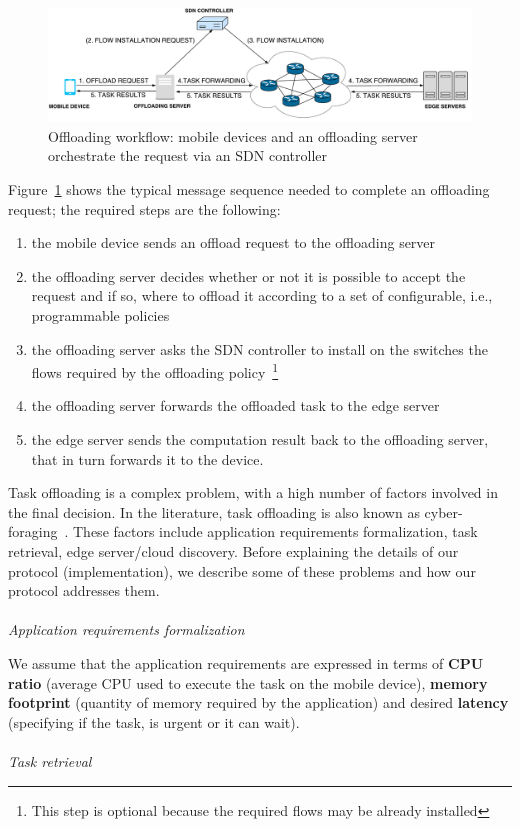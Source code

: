 \begin{figure}
\centering
\includegraphics[width=\textwidth]{img/protocol_sequence}   
\caption{Offloading workflow: mobile devices and an offloading server orchestrate the request via an SDN controller}
\label{fig:protocol}
\end{figure}

Figure~\ref{fig:protocol} shows the typical message sequence needed to complete an offloading request; the required steps are the following:
\begin{enumerate}
\item the mobile device sends an offload request to the offloading server
\item the offloading server decides whether or not it is possible to accept the request and if so, where to offload it according to a set of configurable, i.e., programmable policies
\item the offloading server asks the SDN controller to install on the switches the flows required by the offloading policy~\footnote{This step is optional  because the required flows may be already installed}
\item the offloading server forwards the offloaded task to the edge server 
\item the edge server sends the computation result back to the offloading server, that in turn forwards it to the device.
\end{enumerate}

Task offloading is a complex problem, with a high number of factors involved in the final decision. In the literature, task offloading is also known as cyber-foraging~\cite{cyberforagingsurvey}. These factors include application requirements formalization, task retrieval, edge server/cloud discovery. Before explaining the details of our protocol (implementation), we describe some of these problems and how our protocol addresses them.\\\\
\textit{Application requirements formalization}

We assume that the application requirements are expressed in terms of \textbf{CPU ratio} (average CPU used to execute the task on the mobile device), \textbf{memory footprint} (quantity of memory required by the application) and desired \textbf{latency} (specifying if the task, is urgent or it can wait).\\\\
\textit{Task retrieval}


